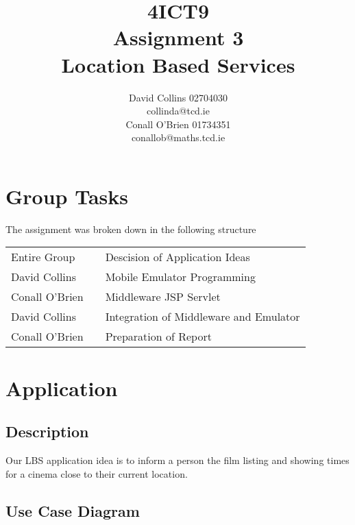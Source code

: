 \documentclass[a4paper,12pt]{article}
\begin{document}
\title{4ICT9 \\ Assignment 3 \\ Location Based Services}

\author{David Collins 02704030 \\ collinda@tcd.ie \\ 
Conall O'Brien 01734351 \\ conallob@maths.tcd.ie}

\maketitle

\section{Group Tasks}

The assignment was broken down in the following structure

\begin{tabular}{lcl}
Entire Group &	\hspace{15mm}	&	Descision of Application Ideas	\\
David Collins	&					&	Mobile Emulator Programming			\\
Conall O'Brien	&					&	Middleware JSP Servlet \\
David Collins	&					&	Integration	of Middleware and Emulator \\
Conall O'Brien	&					&	Preparation of Report					\\
\end{tabular}

\section{Application}

\subsection{Description}

Our LBS application idea is to inform a person the film listing and 
showing times for a cinema close to their current location.

\subsection{Use Case Diagram}
\end{document}
